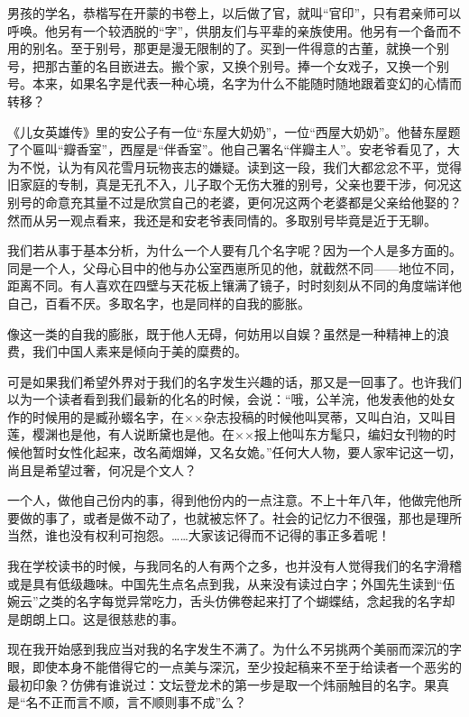 \par 男孩的学名，恭楷写在开蒙的书卷上，以后做了官，就叫“官印”，只有君亲师可以呼唤。他另有一个较洒脱的“字”，供朋友们与平辈的亲族使用。他另有一个备而不用的别名。至于别号，那更是漫无限制的了。买到一件得意的古董，就换一个别号，把那古董的名目嵌进去。搬个家，又换个别号。捧一个女戏子，又换一个别号。本来，如果名字是代表一种心境，名字为什么不能随时随地跟着变幻的心情而转移？
\par 《儿女英雄传》里的安公子有一位“东屋大奶奶”，一位“西屋大奶奶”。他替东屋题了个匾叫“瓣香室”，西屋是“伴香室”。他自己署名“伴瓣主人”。安老爷看见了，大为不悦，认为有风花雪月玩物丧志的嫌疑。读到这一段，我们大都忿忿不平，觉得旧家庭的专制，真是无孔不入，儿子取个无伤大雅的别号，父亲也要干涉，何况这别号的命意充其量不过是欣赏自己的老婆，更何况这两个老婆都是父亲给他娶的？然而从另一观点看来，我还是和安老爷表同情的。多取别号毕竟是近于无聊。
\par 我们若从事于基本分析，为什么一个人要有几个名字呢？因为一个人是多方面的。同是一个人，父母心目中的他与办公室西崽所见的他，就截然不同——地位不同，距离不同。有人喜欢在四壁与天花板上镶满了镜子，时时刻刻从不同的角度端详他自己，百看不厌。多取名字，也是同样的自我的膨胀。
\par 像这一类的自我的膨胀，既于他人无碍，何妨用以自娱？虽然是一种精神上的浪费，我们中国人素来是倾向于美的糜费的。
\par 可是如果我们希望外界对于我们的名字发生兴趣的话，那又是一回事了。也许我们以为一个读者看到我们最新的化名的时候，会说：“哦，公羊浣，他发表他的处女作的时候用的是臧孙蝃名字，在××杂志投稿的时候他叫冥蒂，又叫白泊，又叫目莲，樱渊也是他，有人说断黛也是他。在××报上他叫东方髦只，编妇女刊物的时候他暂时女性化起来，改名蔺烟婵，又名女姽。”任何大人物，要人家牢记这一切，尚且是希望过奢，何况是个文人？
\par 一个人，做他自己份内的事，得到他份内的一点注意。不上十年八年，他做完他所要做的事了，或者是做不动了，也就被忘怀了。社会的记忆力不很强，那也是理所当然，谁也没有权利可抱怨。……大家该记得而不记得的事正多着呢！
\par 我在学校读书的时候，与我同名的人有两个之多，也并没有人觉得我们的名字滑稽或是具有低级趣味。中国先生点名点到我，从来没有读过白字；外国先生读到“伍婉云”之类的名字每觉异常吃力，舌头仿佛卷起来打了个蝴蝶结，念起我的名字却是朗朗上口。这是很慈悲的事。
\par 现在我开始感到我应当对我的名字发生不满了。为什么不另挑两个美丽而深沉的字眼，即使本身不能借得它的一点美与深沉，至少投起稿来不至于给读者一个恶劣的最初印象？仿佛有谁说过：文坛登龙术的第一步是取一个炜丽触目的名字。果真是“名不正而言不顺，言不顺则事不成”么？

